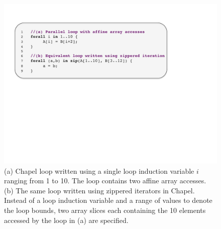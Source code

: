 \begin{figure}
	\begin{center}
	\includegraphics[scale=0.50]{./Figures/affine_loop}
	\caption{(a) Chapel loop written using a single loop induction variable $i$ ranging from 1 to 10. The loop contains two affine array accesses. (b) The same loop written using zippered iterators in Chapel. Instead of a loop induction variable and a range of values to denote the loop bounds, two array slices each containing the 10 elements accessed by the loop in (a) are specified.}
	\label{affine_loop}
	\end{center}
\end{figure}

